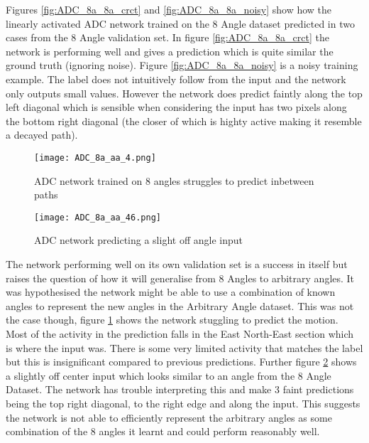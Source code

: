 Figures \ref{fig:ADC_8a_8a_crct} and \ref{fig:ADC_8a_8a_noisy} show how the linearly activated ADC network trained on the 8 Angle dataset predicted in two cases from the 8 Angle validation set.
In figure \ref{fig:ADC_8a_8a_crct} the network is performing well and gives a prediction which is quite similar the ground truth (ignoring noise). 
Figure \ref{fig:ADC_8a_8a_noisy} is a noisy training example.
The label does not intuitively follow from the input and the network only outputs small values.
However the network does predict faintly along the top left diagonal which is sensible when considering the input has two pixels along the bottom right diagonal (the closer of which is highty active making it resemble a decayed path). 

\begin{figure}
    \centering
    \texttt{[image: ADC\_8a\_aa\_4.png]}
    \caption{ADC network trained on 8 angles struggles to predict inbetween paths}
    \label{fig:ADC_8aNoaa}
\end{figure}

\begin{figure}
    \centering
    \texttt{[image: ADC\_8a\_aa\_46.png]}
    \caption{ADC network predicting a slight off angle input}
    \label{fig:ADC_8aNoaa_fork}
\end{figure}

The network performing well on its own validation set is a success in itself but raises the question of how it will generalise from 8 Angles to arbitrary angles.
It was hypothesised the network might be able to use a combination of known angles to represent the new angles in the Arbitrary Angle dataset.
This was not the case though, figure \ref{fig:ADC_8aNoaa} shows the network stuggling to predict the motion.
Most of the activity in the prediction falls in the East North-East section which is where the input was.
There is some very limited activity that matches the label but this is insignificant compared to previous predictions. 
Further figure \ref{fig:ADC_8aNoaa_fork} shows a slightly off center input which looks similar to an angle from the 8 Angle Dataset. 
The network has trouble interpreting this and make 3 faint predictions being the top right diagonal, to the right edge and along the input.
This suggests the network is not able to efficiently represent the arbitrary angles as some combination of the 8 angles it learnt and could perform reasonably well.

